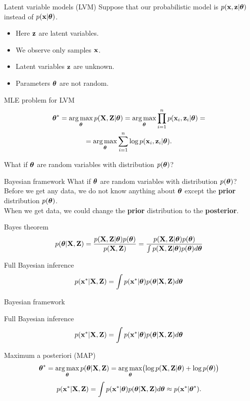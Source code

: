 \begin{frame}{Latent variable models (LVM)}
    Suppose that our probabilistic model is $p(\mathbf{x}, \mathbf{z} | \boldsymbol{\theta})$ instead of $p(\mathbf{x} | \boldsymbol{\theta})$.
    \begin{itemize}
        \item Here $\mathbf{z}$ are latent variables.
        \item We observe only samples $\mathbf{x}$. 
        \item Latent variables $\mathbf{z}$ are unknown.
        \item Parameters $\boldsymbol{\theta}$ are not random.
    \end{itemize}
    \begin{block}{MLE problem for LVM}
    \vspace{-0.3cm}
    \begin{multline*}
        \boldsymbol{\theta}^* = \operatorname*{arg\,max}_{\boldsymbol{\theta}} p(\mathbf{X}, \mathbf{Z} | \boldsymbol{\theta}) = \operatorname*{arg\,max}_{\boldsymbol{\theta}} \prod_{i=1}^n p(\mathbf{x}_i, \mathbf{z}_i | \boldsymbol{\theta}) = \\ = \operatorname*{arg\,max}_{\boldsymbol{\theta}} \sum_{i=1}^n \log p(\mathbf{x}_i, \mathbf{z}_i | \boldsymbol{\theta}).
    \end{multline*}
    \vspace{-0.1cm}
    \end{block}
    What if $\boldsymbol{\theta}$ are random variables with distribution $p(\boldsymbol{\theta})$?
\end{frame}
\begin{frame}{Bayesian framework}
    What if $\boldsymbol{\theta}$ are random variables with distribution $p(\boldsymbol{\theta})$? \\
    Before we get any data, we do not know anything about $\boldsymbol{\theta}$ except the \textbf{prior}  distribution $p(\boldsymbol{\theta})$. \\
    When we get data, we could change the \textbf{prior} distribution to the \textbf{posterior}. 
    \begin{block}{Bayes theorem}
    \[
        p(\boldsymbol{\theta} | \mathbf{X}, \mathbf{Z}) = \frac{p(\mathbf{X}, \mathbf{Z} | \boldsymbol{\theta}) p(\boldsymbol{\theta})}{p(\mathbf{X}, \mathbf{Z})} = \frac{p(\mathbf{X}, \mathbf{Z} | \boldsymbol{\theta}) p(\boldsymbol{\theta})}{\int p(\mathbf{X} , \mathbf{Z} | \boldsymbol{\theta}) p(\boldsymbol{\theta}) d \boldsymbol{\theta}} 
    \]
    \end{block}
    \begin{block}{Full Bayesian inference}
    \[
        p(\mathbf{x}^* | \mathbf{X}, \mathbf{Z}) = \int p(\mathbf{x}^* | \boldsymbol{\theta}) p(\boldsymbol{\theta} | \mathbf{X}, \mathbf{Z}) d \boldsymbol{\theta}
    \]
    \end{block}
\end{frame}
\begin{frame}{Bayesian framework}
    \begin{block}{Full Bayesian inference}
    \[
        p(\mathbf{x}^* | \mathbf{X}, \mathbf{Z}) = \int p(\mathbf{x}^* | \boldsymbol{\theta}) p(\boldsymbol{\theta} | \mathbf{X}, \mathbf{Z}) d \boldsymbol{\theta}
    \]
    \end{block}
    \begin{block}{Maximum a posteriori (MAP)}
    \vspace{-0.2cm}
    \[
        \boldsymbol{\theta}^* = \operatorname*{arg\,max}_{\boldsymbol{\theta}} p(\boldsymbol{\theta} | \mathbf{X}, \mathbf{Z}) = \operatorname*{arg\,max}_{\boldsymbol{\theta}} \bigl(\log p(\mathbf{X}, \mathbf{Z} | \boldsymbol{\theta}) + \log p(\boldsymbol{\theta}) \bigr)
    \]
    \vspace{-0.2cm}
    \[
    p(\mathbf{x}^* | \mathbf{X}, \mathbf{Z}) = \int p(\mathbf{x}^* | \boldsymbol{\theta}) p(\boldsymbol{\theta} | \mathbf{X}, \mathbf{Z}) d \boldsymbol{\theta} \approx p(\mathbf{x}^* | \boldsymbol{\theta}^*).
    \]
    \end{block}
\end{frame}
